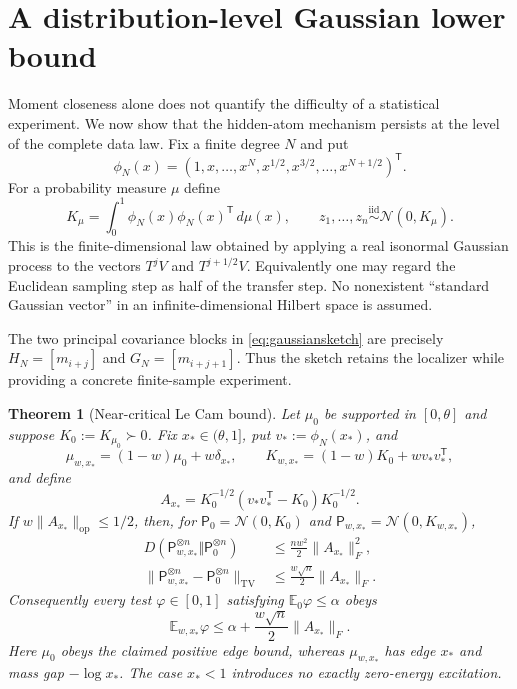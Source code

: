 \documentclass[11pt]{article}
\newtheorem{theorem}{Theorem}[section]
\theoremstyle{definition}
\theoremstyle{remark}
\begin{document}
\section{A distribution-level Gaussian lower bound}
\label{sec:lecam}

Moment closeness alone does not quantify the difficulty of a statistical
experiment.  We now show that the hidden-atom mechanism persists at the level
of the complete data law.  Fix a finite degree $N$ and put
\begin{equation}
 \phi_N(x)=(1,x,\ldots,x^N,x^{1/2},x^{3/2},\ldots,x^{N+1/2})^{\mathsf T}.
 \label{eq:features}
\end{equation}
For a probability measure $\mu$ define
\begin{equation}
 K_\mu=\int_0^1\phi_N(x)\phi_N(x)^{\mathsf T}\,d\mu(x),
 \qquad z_1,\ldots,z_n\stackrel{\mathrm{iid}}\sim\mathcal N(0,K_\mu).
 \label{eq:gaussiansketch}
\end{equation}
This is the finite-dimensional law obtained by applying a real isonormal
Gaussian process to the vectors
$T^jV$ and $T^{j+1/2}V$.  Equivalently one may regard the Euclidean sampling
step as half of the transfer step.  No nonexistent ``standard Gaussian vector''
in an infinite-dimensional Hilbert space is assumed.

The two principal covariance blocks in \eqref{eq:gaussiansketch} are precisely
$H_N=[m_{i+j}]$ and $G_N=[m_{i+j+1}]$.  Thus the sketch retains the localizer
while providing a concrete finite-sample experiment.

\begin{theorem}[Near-critical Le Cam bound]               \label{thm:lecam}
Let $\mu_0$ be supported in $[0,\theta]$ and suppose
$K_0:=K_{\mu_0}\succ0$.  Fix $x_*\in(\theta,1]$, put
$v_*:=\phi_N(x_*)$, and
\begin{equation}
 \mu_{w,x_*}=(1-w)\mu_0+w\delta_{x_*},\qquad
 K_{w,x_*}=(1-w)K_0+wv_*v_*^{\mathsf T},               \label{eq:Kw}
\end{equation}
and define
\begin{equation}
 A_{x_*}=K_0^{-1/2}(v_*v_*^{\mathsf T}-K_0)K_0^{-1/2}.
\end{equation}
If $w\|A_{x_*}\|_{\mathrm{op}}\leq1/2$, then, for
$\mathsf P_0=\mathcal N(0,K_0)$ and
$\mathsf P_{w,x_*}=\mathcal N(0,K_{w,x_*})$,
\begin{align}
 D(\mathsf P_{w,x_*}^{\otimes n}\Vert\mathsf P_0^{\otimes n})
 &\leq \frac{nw^2}{2}\|A_{x_*}\|_F^2,                    \label{eq:KLbound}\\
 \|\mathsf P_{w,x_*}^{\otimes n}-\mathsf P_0^{\otimes n}\|_{\mathrm{TV}}
 &\leq \frac{w\sqrt n}{2}\|A_{x_*}\|_F.                 \label{eq:TVbound}
\end{align}
Consequently every test $\varphi\in[0,1]$ satisfying
$\mathbb E_0\varphi\leq\alpha$ obeys
\begin{equation}
 \mathbb E_{w,x_*}\varphi\leq
 \alpha+\frac{w\sqrt n}{2}\|A_{x_*}\|_F.          \label{eq:powerupper}
\end{equation}
Here $\mu_0$ obeys the claimed positive edge bound, whereas $\mu_{w,x_*}$ has edge
$x_*$ and mass gap $-\log x_*$.  The case $x_*<1$ introduces no exactly
zero-energy excitation.
\end{theorem}
\end{document}
